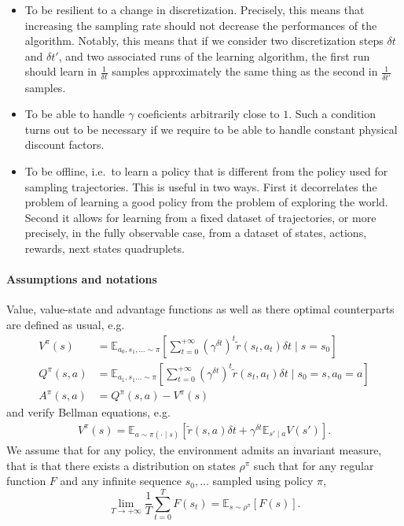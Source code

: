\documentclass[11pt]{article}
\newcommand{\deltat}{{\delta t}}
\newcommand{\E}{\mathbb{E}}
\begin{document}
\begin{itemize}
	\item To be resilient to a change in discretization. Precisely, this
		means that increasing the sampling rate should not decrease the
		performances of the algorithm. Notably, this means that if we consider
		two discretization steps $\deltat$ and $\deltat'$, and two associated
		runs of the learning algorithm, the first run should learn in $\frac{1}{\deltat}$
		samples approximately the same thing as the second in $\frac{1}{\deltat'}$ samples.
	\item To be able to handle $\gamma$ coeficients arbitrarily close to $1$.
		Such a condition turns out to be necessary if we require to
		be able to handle constant physical discount factors.
	\item To be offline, i.e.\ to learn a policy that is different from
		the policy used for sampling trajectories. This is useful in
		two ways. First it decorrelates the problem of learning a good
		policy from the problem of exploring the world. Second it
		allows for learning from a fixed dataset of trajectories, or more
		precisely, in the fully observable case, from a dataset of
		states, actions, rewards, next states quadruplets.
\end{itemize}

\paragraph{Assumptions and notations}
Value, value-state and advantage functions as well as there
optimal counterparts are defined as usual, e.g.
\begin{align}
	V^\pi(s) &= \E_{a_0, s_1, \ldots \sim \pi}
	\left[
		\sum\limits_{t=0}^{+\infty}
		(\gamma^\deltat)^t \tilde{r}(s_t, a_t) \deltat
		\mid s=s_0
	\right]\\
	Q^\pi(s, a) &= \E_{a_1, s_1\ldots \sim \pi}
	\left[
		\sum\limits_{t=0}^{+\infty}
		(\gamma^\deltat)^t \tilde{r}(s_t, a_t) \deltat
		\mid s_0=s, a_0=a
	\right]\\
	A^\pi(s,a ) &= Q^\pi(s, a) - V^\pi(s)
\end{align}
and verify Bellman equations, e.g.
\begin{align}
	V^\pi(s) = \E_{a\sim\pi(\cdot\mid s)}
	\left[
		\tilde{r}(s, a) \deltat +
		\gamma^\deltat \E_{s'\mid a} V(s')
	\right].
\end{align}
We assume that for any policy, the environment admits an invariant
measure, that is that there exists a distribution on states $\rho^\pi$ such that for
any regular function $F$ and any infinite sequence $s_0, \ldots$ sampled using policy
$\pi$,
\begin{equation}
	\lim\limits_{T\to+\infty}
	\frac{1}{T}
	\sum\limits_{t=0}^T F(s_t) =
	\E_{s\sim \rho^\pi}\left[
		F(s)
	\right].
	\label{eq:ergodic}
\end{equation}
\end{document}

